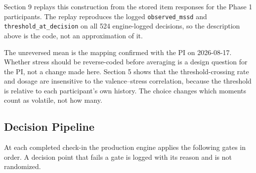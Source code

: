 \documentclass[11pt,letterpaper]{article}
\begin{document}
Section 9 replays this construction from the stored item responses for the Phase 1 participants. The replay reproduces the logged \texttt{observed\_mssd} and \texttt{threshold\_at\_decision} on all 524 engine-logged decisions, so the description above is the code, not an approximation of it.

The unreversed mean is the mapping confirmed with the PI on 2026-08-17. Whether stress should be reverse-coded before averaging is a design question for the PI, not a change made here. Section 5 shows that the threshold-crossing rate and dosage are insensitive to the valence--stress correlation, because the threshold is relative to each participant's own history. The choice changes which moments count as volatile, not how many.

\subsection{Decision Pipeline}

At each completed check-in the production engine applies the following gates in order. A decision point that fails a gate is logged with its reason and is not randomized.
\end{document}
